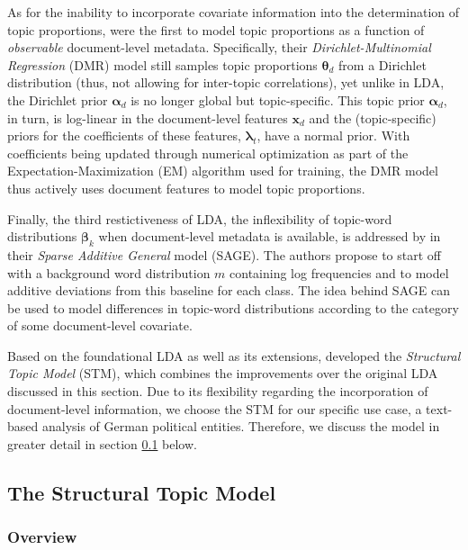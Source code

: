 As for the inability to incorporate covariate information into the determination of topic proportions, \cite{mimno2011optimizing} were the first to model topic proportions as a function of \textit{observable} document-level metadata. Specifically, their \textit{Dirichlet-Multinomial Regression} (DMR) model still samples topic proportions $\boldsymbol{\theta}_d$ from a Dirichlet distribution (thus, not allowing for inter-topic correlations), yet unlike in LDA, the Dirichlet prior $\boldsymbol{\alpha}_d$ is no longer global but topic-specific. This topic prior $\boldsymbol{\alpha}_d$, in turn, is log-linear in the document-level features $\boldsymbol{x}_d$ and the (topic-specific) priors for the coefficients of these features, $\boldsymbol{\lambda}_t$, have a normal prior. With coefficients being updated through numerical optimization as part of the Expectation-Maximization (EM) algorithm used for training, the DMR model thus actively uses document features to model topic proportions. 

Finally, the third restictiveness of LDA, the inflexibility of topic-word distributions $\boldsymbol{\beta}_k$ when document-level metadata is available, is addressed by \cite{eisenstein2011sparse} in their \textit{Sparse Additive General} model (SAGE). The authors propose to start off with a background word distribution $m$ containing log frequencies and to model additive deviations from this baseline for each class. The idea behind SAGE can be used to model differences in topic-word distributions according to the category of some document-level covariate.

Based on the foundational LDA as well as its extensions, \cite{roberts2016model} developed the \textit{Structural Topic Model} (STM), which combines the improvements over the original LDA discussed in this section. Due to its flexibility regarding the incorporation of document-level information, we choose the STM for our specific use case, a text-based analysis of German political entities. Therefore, we discuss the model in greater detail in section \ref{The Structural Topic Model} below.

\subsection{The Structural Topic Model}
\label{The Structural Topic Model}

\subsubsection*{Overview}

